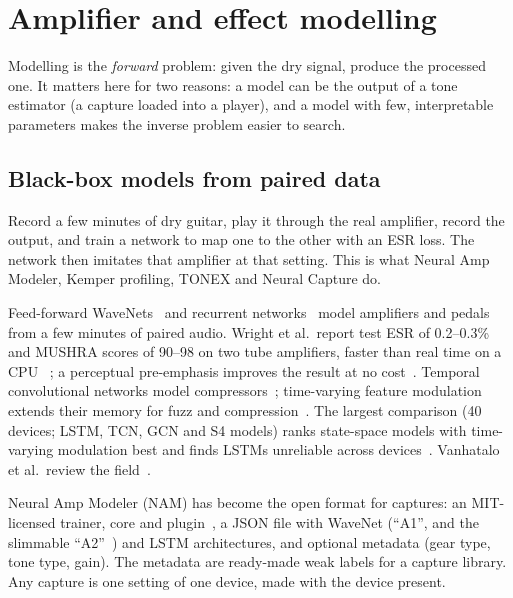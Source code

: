 \section{Amplifier and effect modelling}
\label{sec:modelling}

Modelling is the \emph{forward} problem: given the dry signal, produce the
processed one. It matters here for two reasons: a model can be the output of a
tone estimator (a capture loaded into a player), and a model with few,
interpretable parameters makes the inverse problem easier to search.

\subsection{Black-box models from paired data}

\begin{keyidea}[: capture = learn the device from dry/wet pairs]
Record a few minutes of dry guitar, play it through the real amplifier, record
the output, and train a network to map one to the other with an ESR loss. The
network then imitates that amplifier at that setting. This is what Neural Amp
Modeler, Kemper profiling, TONEX and Neural Capture do.
\end{keyidea}

Feed-forward WaveNets~\cite{damskagg2019deep,damskagg2019realtime} and recurrent
networks~\cite{wright2019realtime} model amplifiers and pedals from a few minutes
of paired audio. Wright et al.\ report test ESR of 0.2--0.3\% and MUSHRA scores
of 90--98 on two tube amplifiers, faster than real time on a CPU
\reported~\cite{wright2020realtime}; a perceptual pre-emphasis improves the
result at no cost~\cite{wright2020perceptual}. Temporal convolutional networks
model compressors~\cite{steinmetz2022efficient}; time-varying feature modulation
extends their memory for fuzz and compression~\cite{comunita2023modelling}. The
largest comparison (40 devices; LSTM, TCN, GCN and S4 models) ranks state-space
models with time-varying modulation best and finds LSTMs unreliable across
devices~\cite{comunita2025differentiable}. Vanhatalo et al.\ review the
field~\cite{vanhatalo2022review}.

Neural Amp Modeler (NAM) has become the open format for captures: an MIT-licensed
trainer, core and plugin~\cite{atkinsonndnam}, a JSON  file with
WaveNet (``A1'', and the slimmable ``A2''~\cite{atkinson2025slimmable,atkinson2026a2})
and LSTM architectures, and optional metadata (gear type, tone type, gain). The
metadata are ready-made weak labels for a capture library. Any capture is one
setting of one device, made with the device present.

